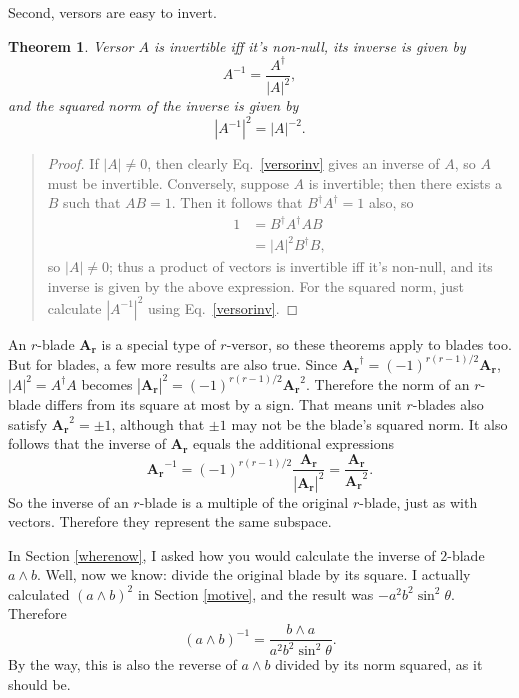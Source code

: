 \documentclass{utarticle}
\newcommand{\bl}[1]{\ensuremath{\bm{#1}}}
\DeclareMathOperator{\out}{\wedge}
\newcommand{\rev}[1]{\ensuremath{#1^\dagger}}
\newtheorem{thm}{Theorem}
\newcommand{\bp}{\begin{quotation} \begin{proof}}
\newcommand{\ep}{\end{proof} \end{quotation}}
\begin{document}
Second, versors are easy to invert.
\begin{thm}
Versor $A$ is invertible iff it's non-null, its inverse is given by
\begin{equation} 
A^{-1} = \frac{\rev{A}}{|A|^2}, 
\label{versorinv}
\end{equation}
and the squared norm of the inverse is given by
\begin{equation} |A^{-1}|^2 = |A|^{-2}. \end{equation}
\label{inviffnonnull}
\end{thm}
\bp
If $|A| \neq 0$, then clearly Eq.~\eqref{versorinv} gives an inverse 
of $A$, so $A$ must be invertible.  Conversely, suppose $A$ is invertible; 
then there exists a $B$ such that $A B = 1$.  Then it follows that 
$\rev{B} \rev{A} = 1$ also, so
\begin{align}
1 & = \rev{B} \rev{A} A B \nonumber \\
  & = |A|^2 \rev{B} B, 
\end{align}
so $|A| \neq 0$; thus a product of vectors is invertible iff it's non-null, 
and its inverse is given by the above expression.  For the squared norm,
just calculate $|A^{-1}|^2$ using Eq.~\eqref{versorinv}.
\ep

An $r$-blade \bl{A_r} is a special type of $r$-versor, so these theorems apply to 
blades too.  But for blades, a few more results are also true.  Since $\rev{\bl{A_r}} = 
(-1)^{r(r-1)/2} \bl{A_r}$, $|A|^2 = \rev{A}A$ becomes $|\bl{A_r}|^2 = (-1)^{r(r-1)/2}\bl{A_r}^2$.  
Therefore the norm of an $r$-blade differs from its square at most by a sign.  
That means unit $r$-blades also satisfy $\bl{A_r}^2 = \pm1$, although that 
$\pm1$ may not be the blade's squared norm.  It also follows that the inverse 
of \bl{A_r} equals the additional expressions
\begin{equation} 
\bl{A_r}^{-1} = (-1)^{r(r-1)/2} \frac{\bl{A_r}}{|\bl{A_r}|^2} = \frac{\bl{A_r}}{\bl{A_r}^2}. 
\label{bladeinv}
\end{equation}
So the inverse of an $r$-blade is a multiple of the original $r$-blade, just as with vectors.  
Therefore they represent the same subspace.

In Section \ref{wherenow}, I asked how you would calculate the inverse
of $2$-blade $a \out b$.  Well, now we know: divide the original blade by 
its square.  I actually calculated $(a \out b)^2$ in Section \ref{motive}, and the 
result was $-a^2b^2\sin^2\theta$.  Therefore
\begin{equation} 
(a \out b)^{-1} = \frac{b \out a}{a^2 b^2 \sin^2\theta}. 
\end{equation}
By the way, this is also the reverse of $a \out b$ divided by its norm squared, 
as it should be.
\end{document}
